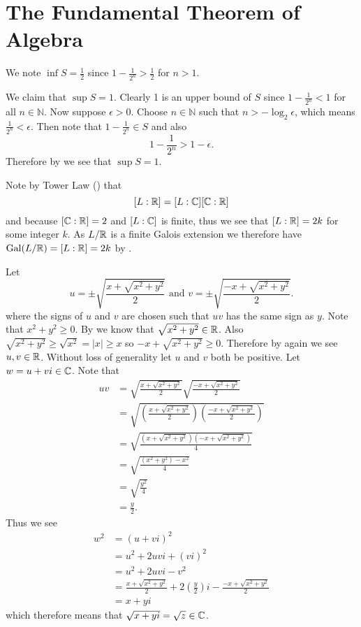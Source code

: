 \section{The Fundamental Theorem of Algebra}
\begin{questions}
    \item We note $\inf S = \frac12$ since $1 - \frac1{2^n} >
    \frac12$ for $n > 1$.

    We claim that $\sup S = 1$. Clearly 1 is an upper bound of $S$ since $1 - \frac1{2^n} < 1$ for all $n \in \mathbb{N}$. Now suppose $\epsilon > 0$. Choose $n \in \mathbb{N}$ such that $n > -\log_2\epsilon$, which means $\frac1{2^n} < \epsilon$. Then note that $1 - \frac1{2^n} \in S$ and also
    \[
        1 - \frac1{2^n} > 1 - \epsilon.
    \]
    Therefore by  we see that $\sup S = 1$.

    \item Note by Tower Law () that
    \[
        [L:\mathbb{R}] = [L:\mathbb{C}][\mathbb{C}:\mathbb{R}]
    \]
    and because $[\mathbb{C}:\mathbb{R}] = 2$ and $[L:\mathbb{C}]$ is finite, thus we see that $[L:\mathbb{R}] = 2k$ for some integer $k$. As $L/\mathbb{R}$ is a finite Galois extension we therefore have $\mathrm{Gal}(L/\mathbb{R}) = [L:\mathbb{R}] = 2k$ by .

    \item Let
    \[
        u = \pm\sqrt{\frac{x + \sqrt{x^2+y^2}}{2}} \text{ and } v = \pm\sqrt{\frac{-x + \sqrt{x^2+y^2}}{2}}.
    \]
    where the signs of $u$ and $v$ are chosen such that $uv$ has the same sign as $y$. Note that $x^2 + y^2 \geq 0$. By  we know that $\sqrt{x^2+y^2} \in \mathbb{R}$. Also $\sqrt{x^2+y^2} \geq \sqrt{x^2} = |x| \geq x$ so $-x + \sqrt{x^2+y^2} \geq 0$. Therefore by  again we see $u, v \in \mathbb{R}$. Without loss of generality let $u$ and $v$ both be positive. Let $w = u + vi \in \mathbb{C}$. Note that
    \begin{align*}
        uv &= \sqrt{\frac{x + \sqrt{x^2+y^2}}{2}}\sqrt{\frac{-x + \sqrt{x^2+y^2}}{2}}\\
        &= \sqrt{\left(\frac{x + \sqrt{x^2+y^2}}{2}\right)\left(\frac{-x + \sqrt{x^2+y^2}}{2}\right)}\\
        &= \sqrt{\frac{\left(x + \sqrt{x^2+y^2}\right)\left(-x + \sqrt{x^2+y^2}\right)}{4}}\\
        &= \sqrt{\frac{(x^2+y^2)-x^2}{4}}\\
        &= \sqrt{\frac{y^2}4}\\
        &= \frac y2.
    \end{align*}
    Thus we see
    \begin{align*}
        w^2 &= (u+vi)^2\\
        &= u^2 + 2uvi + (vi)^2\\
        &= u^2 + 2uvi - v^2\\
        &= \frac{x + \sqrt{x^2+y^2}}{2} + 2\left(\frac y2\right)i - \frac{-x + \sqrt{x^2+y^2}}{2}\\
        &= x + yi
    \end{align*}
    which therefore means that $\sqrt{x+yi} = \sqrt{z} \in \mathbb{C}$.
\end{questions}
